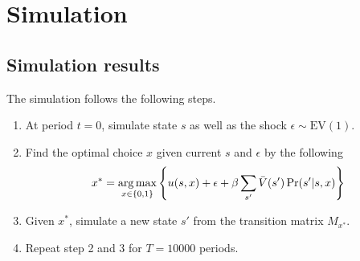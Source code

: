 \documentclass[12pt]{article}[margin=1in]
\begin{document}
\section{Simulation}
\subsection{Simulation results} The simulation follows the following steps.
\begin{enumerate}
    \item At period $t=0$, simulate state $s$ as well as the shock $\epsilon \sim
              \text{EV}(1)$.
    \item Find the optimal choice $x$ given current $s$ and $\epsilon$ by the following
          \begin{equation*}
              x^* = \operatorname*{arg\,max}_{x
                  \in \{0,1\}}  \left\{ u(s,x) + \epsilon+ \beta
              \sum_{s'}\bar{V}(s')\Pr(s'|s,x) \right\}
          \end{equation*}
    \item Given $x^*$, simulate a new state $s'$ from the transition matrix $M_{x^*}$.
    \item Repeat step 2 and 3 for $T=10000$ periods.
\end{enumerate}
\end{document}
